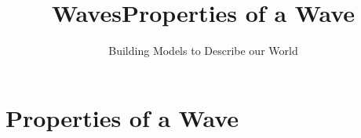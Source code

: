 \documentclass[aspectratio=169,
hyperref={colorlinks,urlcolor=blue}
]{beamer}
\begin{document}





































\title{Waves}
\subject{Wave Properties, Descriptions and Phenomena}
\subtitle{Building Models to Describe our World}

\begin{frame}
\label{chap:waves}
\titlepage
\thispagestyle{empty}
\end{frame}


  {\tableofcontents[sections={37,38}, subsectionstyle=show/show]\thispagestyle{empty}}
  {\tableofcontents[sections={39}, subsectionstyle=show/show]}





\section{Properties of a Wave}
\label{sec:propertiesofawave}
\title{Properties of a Wave}


\begin{frame}
\titlepage
\thispagestyle{empty}
\end{frame}



\end{document}
